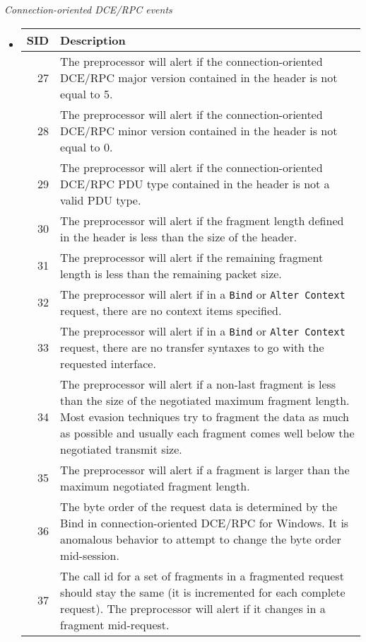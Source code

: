 \documentclass[english]{report}
\begin{document}
\textit{Connection-oriented DCE/RPC events}
\begin{itemize}
\item[]

\begin{longtable}[h]{|r|p{13.5cm}|}
\hline
SID & Description\\
\hline

\hline
 27 & The preprocessor will alert if the connection-oriented DCE/RPC major
      version contained in the header is not equal to 5.\\
\hline
 28 & The preprocessor will alert if the connection-oriented DCE/RPC minor
      version contained in the header is not equal to 0.\\
\hline
 29 & The preprocessor will alert if the connection-oriented DCE/RPC PDU type
      contained in the header is not a valid PDU type.\\
\hline
 30 & The preprocessor will alert if the fragment length defined in the header
      is less than the size of the header.\\
\hline
 31 & The preprocessor will alert if the remaining fragment length is less
      than the remaining packet size.\\
\hline
 32 & The preprocessor will alert if in a \texttt{Bind} or
      \texttt{Alter Context} request, there are no context items specified.\\
\hline
 33 & The preprocessor will alert if in a \texttt{Bind} or
      \texttt{Alter Context} request, there are no transfer syntaxes to go with
      the requested interface.\\
\hline
 34 & The preprocessor will alert if a non-last fragment is less than the size
      of the negotiated maximum fragment length. Most evasion techniques try
      to fragment the data as much as possible and usually each fragment comes
      well below the negotiated transmit size.\\
\hline
 35 & The preprocessor will alert if a fragment is larger than the maximum
      negotiated fragment length.\\
\hline
 36 & The byte order of the request data is determined by the Bind in
      connection-oriented DCE/RPC for Windows.  It is anomalous behavior
      to attempt to change the byte order mid-session.\\
\hline
 37 & The call id for a set of fragments in a fragmented request should stay
      the same (it is incremented for each complete request). The preprocessor
      will alert if it changes in a fragment mid-request.\\

\end{longtable}
\end{itemize}
\end{document}
